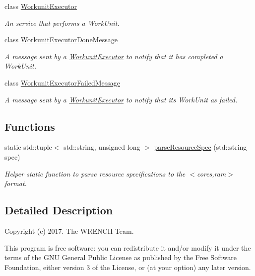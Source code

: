 \begin{DoxyCompactItemize}
class \hyperlink{classwrench_1_1_workunit_executor}{Workunit\+Executor}
\begin{DoxyCompactList}\small\item\em An service that performs a Work\+Unit. \end{DoxyCompactList}\item 
class \hyperlink{classwrench_1_1_workunit_executor_done_message}{Workunit\+Executor\+Done\+Message}
\begin{DoxyCompactList}\small\item\em A message sent by a \hyperlink{classwrench_1_1_workunit_executor}{Workunit\+Executor} to notify that it has completed a Work\+Unit. \end{DoxyCompactList}\item 
class \hyperlink{classwrench_1_1_workunit_executor_failed_message}{Workunit\+Executor\+Failed\+Message}
\begin{DoxyCompactList}\small\item\em A message sent by a \hyperlink{classwrench_1_1_workunit_executor}{Workunit\+Executor} to notify that its Work\+Unit as failed. \end{DoxyCompactList}\end{DoxyCompactItemize}
\subsection*{Functions}
\begin{DoxyCompactItemize}
\item 
static std\+::tuple$<$ std\+::string, unsigned long $>$ \hyperlink{namespacewrench_a9601a7728120192951232d2e0a74a483}{parse\+Resource\+Spec} (std\+::string spec)
\begin{DoxyCompactList}\small\item\em Helper static function to parse resource specifications to the $<$cores,ram$>$ format. \end{DoxyCompactList}\end{DoxyCompactItemize}


\subsection{Detailed Description}
Copyright (c) 2017. The W\+R\+E\+N\+CH Team.

This program is free software\+: you can redistribute it and/or modify it under the terms of the G\+NU General Public License as published by the Free Software Foundation, either version 3 of the License, or (at your option) any later version.

